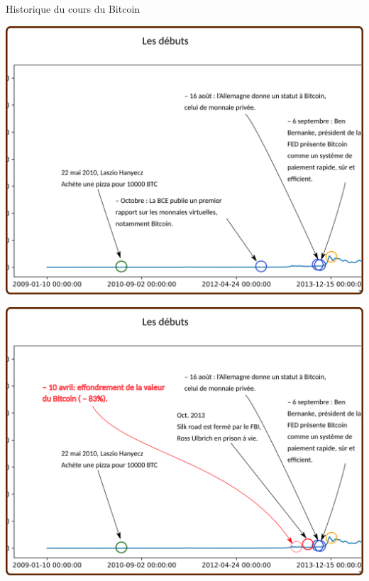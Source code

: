 \documentclass[presentation]{beamer}
\begin{document}
\begin{frame}[label={sec:org6ff9387}]{Historique du cours du Bitcoin}
\begin{block}{}
\begin{center}
\includegraphics[width=.95\textwidth]{./Pictures/Timeline/12debut_FED.png}
\end{center}
\end{block}

\begin{block}{}
\begin{center}
\includegraphics[width=.95\textwidth]{./Pictures/Timeline/13debut_realite.png}
\end{center}
\end{block}


\end{frame}
\end{document}
